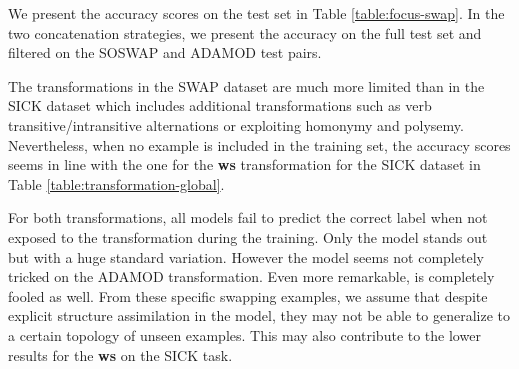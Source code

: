We present the accuracy scores on the test set in Table \ref{table:focus-swap}. In the two concatenation strategies, we present the accuracy on the full test set and filtered on the SOSWAP and ADAMOD test pairs. 

The transformations in the SWAP dataset are much more limited than in the SICK dataset which includes additional transformations such as verb transitive/intransitive alternations or exploiting homonymy and polysemy. 
Nevertheless, when no example is included in the training set, the accuracy scores seems in line with the one for the \textbf{ws} transformation for the SICK dataset in Table \ref{table:transformation-global}. 

For both transformations, all models fail to predict the correct label when not exposed to the transformation during the training. Only the \bow model stands out but with a huge standard variation. However the \dep model seems not completely tricked on the ADAMOD transformation. Even more remarkable, \bert is completely fooled as well. From these specific swapping examples, we assume that despite explicit structure assimilation in the model, they may not be able to generalize to a certain topology of unseen examples. This may also contribute to the lower results for the \textbf{ws} on the SICK task.






